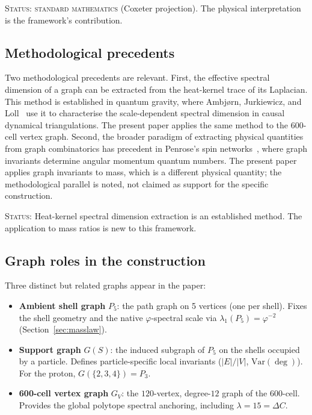 \documentclass[12pt]{article}
\newcommand{\phig}{\varphi}
\begin{document}
\textsc{Status: standard mathematics} (Coxeter projection). The physical interpretation is the framework's contribution.

\subsection{Methodological precedents}

Two methodological precedents are relevant. First, the effective spectral dimension of a graph can be extracted from the heat-kernel trace of its Laplacian. This method is established in quantum gravity, where Ambj{\o}rn, Jurkiewicz, and Loll~\citep{Ambjorn2005} use it to characterise the scale-dependent spectral dimension in causal dynamical triangulations. The present paper applies the same method to the 600-cell vertex graph. Second, the broader paradigm of extracting physical quantities from graph combinatorics has precedent in Penrose's spin networks~\citep{Penrose1971}, where graph invariants determine angular momentum quantum numbers. The present paper applies graph invariants to mass, which is a different physical quantity; the methodological parallel is noted, not claimed as support for the specific construction.

\textsc{Status:} Heat-kernel spectral dimension extraction is an established method. The application to mass ratios is new to this framework.

\subsection{Graph roles in the construction}

Three distinct but related graphs appear in the paper:

\begin{itemize}
    \item \textbf{Ambient shell graph} $P_5$: the path graph on 5 vertices (one per shell). Fixes the shell geometry and the native $\phig$-spectral scale via $\lambda_1(P_5) = \phig^{-2}$ (Section~\ref{sec:masslaw}).
    \item \textbf{Support graph} $G(S)$: the induced subgraph of $P_5$ on the shells occupied by a particle. Defines particle-specific local invariants ($|E|/|V|$, $\mathrm{Var}(\deg)$). For the proton, $G(\{2,3,4\}) = P_3$.
    \item \textbf{600-cell vertex graph} $G_V$: the $120$-vertex, degree-$12$ graph of the 600-cell. Provides the global polytope spectral anchoring, including $\lambda = 15 = \Delta C$.
\end{itemize}
\end{document}
